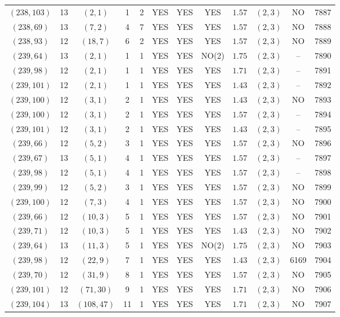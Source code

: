 \begin{longtable}{|c|c|c|c|c|c|c|c|c|c|c|c|}
$(238,103)$ & 13 & $(2,1)$ & 1 & 2 & YES & YES & YES & $1.57$ & $(2,3)$ & NO & 7887\\
$(238,69)$ & 13 & $(7,2)$ & 4 & 7 & YES & YES & YES & $1.57$ & $(2,3)$ & NO & 7888\\
$(238,93)$ & 12 & $(18,7)$ & 6 & 2 & YES & YES & YES & $1.57$ & $(2,3)$ & NO & 7889\\
$(239,64)$ & 13 & $(2,1)$ & 1 & 1 & YES & YES & NO(2) & $1.75$ & $(2,3)$ & -- & 7890\\
$(239,98)$ & 12 & $(2,1)$ & 1 & 1 & YES & YES & YES & $1.71$ & $(2,3)$ & -- & 7891\\
$(239,101)$ & 12 & $(2,1)$ & 1 & 1 & YES & YES & YES & $1.43$ & $(2,3)$ & -- & 7892\\
$(239,100)$ & 12 & $(3,1)$ & 2 & 1 & YES & YES & YES & $1.43$ & $(2,3)$ & NO & 7893\\
$(239,100)$ & 12 & $(3,1)$ & 2 & 1 & YES & YES & YES & $1.57$ & $(2,3)$ & -- & 7894\\
$(239,101)$ & 12 & $(3,1)$ & 2 & 1 & YES & YES & YES & $1.43$ & $(2,3)$ & -- & 7895\\
$(239,66)$ & 12 & $(5,2)$ & 3 & 1 & YES & YES & YES & $1.57$ & $(2,3)$ & NO & 7896\\
$(239,67)$ & 13 & $(5,1)$ & 4 & 1 & YES & YES & YES & $1.57$ & $(2,3)$ & -- & 7897\\
$(239,98)$ & 12 & $(5,1)$ & 4 & 1 & YES & YES & YES & $1.57$ & $(2,3)$ & -- & 7898\\
$(239,99)$ & 12 & $(5,2)$ & 3 & 1 & YES & YES & YES & $1.57$ & $(2,3)$ & NO & 7899\\
$(239,100)$ & 12 & $(7,3)$ & 4 & 1 & YES & YES & YES & $1.57$ & $(2,3)$ & NO & 7900\\
$(239,66)$ & 12 & $(10,3)$ & 5 & 1 & YES & YES & YES & $1.57$ & $(2,3)$ & NO & 7901\\
$(239,71)$ & 12 & $(10,3)$ & 5 & 1 & YES & YES & YES & $1.43$ & $(2,3)$ & NO & 7902\\
$(239,64)$ & 13 & $(11,3)$ & 5 & 1 & YES & YES & NO(2) & $1.75$ & $(2,3)$ & NO & 7903\\
$(239,98)$ & 12 & $(22,9)$ & 7 & 1 & YES & YES & YES & $1.43$ & $(2,3)$ & 6169 & 7904\\
$(239,70)$ & 12 & $(31,9)$ & 8 & 1 & YES & YES & YES & $1.57$ & $(2,3)$ & NO & 7905\\
$(239,101)$ & 12 & $(71,30)$ & 9 & 1 & YES & YES & YES & $1.71$ & $(2,3)$ & NO & 7906\\
$(239,104)$ & 13 & $(108,47)$ & 11 & 1 & YES & YES & YES & $1.71$ & $(2,3)$ & NO & 7907\\

\end{longtable}
